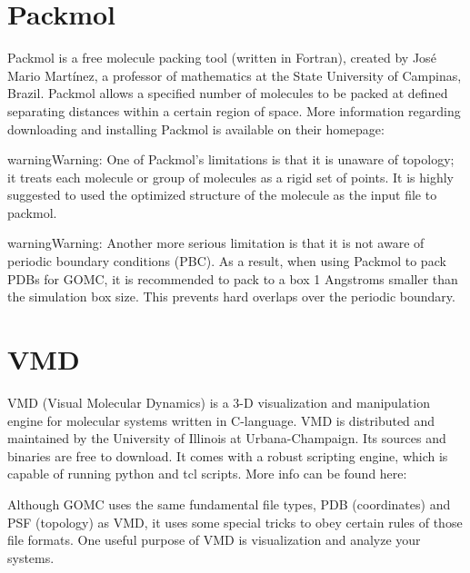 \documentclass[letterpaper,10pt,english]{sphinxmanual}
\begin{document}
\section{Packmol}
\label{\detokenize{software_tools:packmol}}
Packmol is a free molecule packing tool (written in Fortran), created by José Mario Martínez, a professor of mathematics at the State University of Campinas, Brazil. Packmol allows a specified number of molecules to be packed at defined separating distances within a certain region of space. More information regarding downloading and installing Packmol is available on their homepage:


\begin{sphinxadmonition}{warning}{Warning:}
One of Packmol’s limitations is that it is unaware of topology; it treats each molecule or group of molecules as a rigid set of points. It is highly suggested to used the optimized structure of the molecule as the input file to packmol.
\end{sphinxadmonition}

\begin{sphinxadmonition}{warning}{Warning:}
Another more serious limitation is that it is not aware of periodic boundary conditions (PBC). As a result, when using Packmol to pack PDBs for GOMC, it is recommended to pack to a box 1 Angstroms smaller than the simulation box size. This prevents hard overlaps over the periodic boundary.
\end{sphinxadmonition}


\section{VMD}
\label{\detokenize{software_tools:vmd}}
VMD (Visual Molecular Dynamics) is a 3-D visualization and manipulation engine for molecular systems written in C-language. VMD is distributed and maintained by the University of Illinois at Urbana-Champaign. Its sources and binaries are free to download. It comes with a robust scripting engine, which is capable of running python and tcl scripts. More info can be found here:


Although GOMC uses the same fundamental file types, PDB (coordinates) and PSF (topology) as VMD, it uses some special tricks to obey certain rules of those file formats. One useful purpose of VMD is visualization and analyze your systems.
\end{document}
